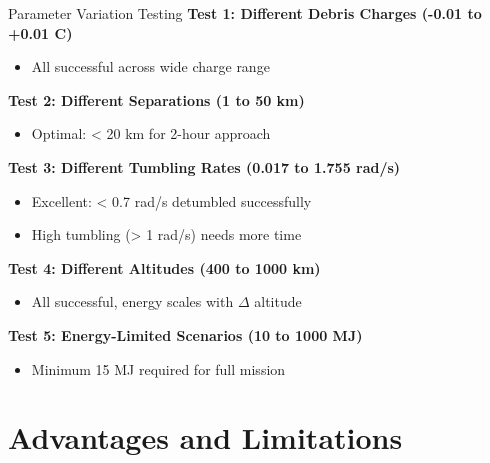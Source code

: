 \documentclass[aspectratio=169]{beamer}
\begin{document}
\begin{frame}{Parameter Variation Testing}
\textbf{Test 1: Different Debris Charges (-0.01 to +0.01 C)}
\begin{itemize}
    \item[\checkmark] All successful across wide charge range
\end{itemize}

\textbf{Test 2: Different Separations (1 to 50 km)}
\begin{itemize}
    \item[\checkmark] Optimal: < 20 km for 2-hour approach
\end{itemize}

\textbf{Test 3: Different Tumbling Rates (0.017 to 1.755 rad/s)}
\begin{itemize}
    \item[\checkmark] Excellent: < 0.7 rad/s detumbled successfully
    \item[!] High tumbling (> 1 rad/s) needs more time
\end{itemize}

\textbf{Test 4: Different Altitudes (400 to 1000 km)}
\begin{itemize}
    \item[\checkmark] All successful, energy scales with $\Delta$ altitude
\end{itemize}

\textbf{Test 5: Energy-Limited Scenarios (10 to 1000 MJ)}
\begin{itemize}
    \item[\checkmark] Minimum 15 MJ required for full mission
\end{itemize}
\end{frame}

\section{Advantages and Limitations}
\end{document}
